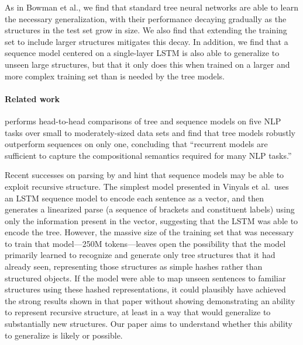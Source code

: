 As in Bowman et al., we find that standard tree neural networks are able to learn the necessary generalization, with their performance decaying gradually as the structures in the test set grow in size. We also find that extending the training set to include larger structures mitigates this decay. In addition, we find that a sequence model centered on a single-layer LSTM is also able to generalize to unseen large structures, but that it only does this when trained on a larger and more complex training set than is needed by the tree models. 

\paragraph{Related work}
 performs head-to-head comparisons of tree and sequence models on five NLP tasks over small to moderately-sized data sets and find that tree models robustly outperform sequences on only one, concluding that ``recurrent models are sufficient to capture the compositional semantics required for many NLP tasks.''

Recent successes on parsing by  and  hint that sequence models may be able to exploit recursive structure. The simplest model presented in Vinyals et al.~uses an LSTM sequence model to encode each sentence as a vector, and then generates a linearized parse (a sequence of brackets and constituent labels) using only the information present in the vector, suggesting that the LSTM was able to encode the tree. However, the massive size of the training set that was necessary to train that model---250M tokens---leaves open the possibility that the model primarily learned to recognize and generate only tree structures that it had already seen, representing those structures as simple hashes rather than structured objects. If the model were able to map unseen sentences to familiar structures using these hashed representations, it could plausibly have achieved the strong results shown in that paper without showing demonstrating an ability to represent recursive structure, at least in a way that would generalize to substantially new structures. Our paper aims to understand whether this ability to generalize is likely or possible.
